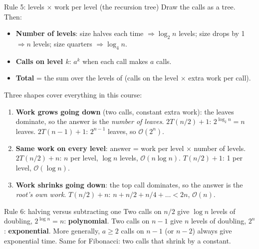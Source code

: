 \documentclass{fkt-notes}
\newcommand{\Oh}{\mathcal{O}}
\begin{document}
\begin{rulebox}{Rule 5: levels $\times$ work per level (the recursion tree)}
Draw the calls as a tree. Then:
\begin{itemize}[leftmargin=1.5em,itemsep=1pt]
  \item \textbf{Number of levels}: size halves each time $\Rightarrow\log_2 n$ levels; size drops by 1 $\Rightarrow n$ levels; size quarters $\Rightarrow\log_4 n$.
  \item \textbf{Calls on level $k$}: $a^k$ when each call makes $a$ calls.
  \item \textbf{Total} = the sum over the levels of (calls on the level $\times$ extra work per call).
\end{itemize}
Three shapes cover everything in this course:
\begin{enumerate}[leftmargin=1.5em,itemsep=1pt]
  \item \textbf{Work grows going down} (two calls, constant extra work): the leaves dominate, so the answer is the \emph{number of leaves}. $2T(n/2)+1$: $2^{\log_2 n}=n$ leaves. $2T(n-1)+1$: $2^{n-1}$ leaves, so $\Oh(2^n)$.
  \item \textbf{Same work on every level}: answer = work per level $\times$ number of levels. $2T(n/2)+n$: $n$ per level, $\log n$ levels, $\Oh(n\log n)$. $T(n/2)+1$: 1 per level, $\Oh(\log n)$.
  \item \textbf{Work shrinks going down}: the top call dominates, so the answer is the \emph{root's own work}. $T(n/2)+n$: $n+n/2+n/4+\dots<2n$, $\Oh(n)$.
\end{enumerate}
\end{rulebox}

\begin{rulebox}{Rule 6: halving versus subtracting one}
Two calls on $n/2$ give $\log n$ levels of doubling, $2^{\log n}=n$: \textbf{polynomial}. Two calls on $n-1$ give $n$ levels of doubling, $2^n$: \textbf{exponential}. More generally, $a\ge2$ calls on $n-1$ (or $n-2$) always give exponential time. Same for Fibonacci: two calls that shrink by a constant.
\end{rulebox}
\end{document}
